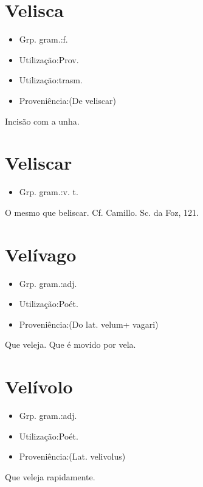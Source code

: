 \documentclass{article}
\begin{document}
\section{Velisca}
\begin{itemize}
\item {Grp. gram.:f.}
\end{itemize}
\begin{itemize}
\item {Utilização:Prov.}
\end{itemize}
\begin{itemize}
\item {Utilização:trasm.}
\end{itemize}
\begin{itemize}
\item {Proveniência:(De \textunderscore veliscar\textunderscore )}
\end{itemize}
Incisão com a unha.
\section{Veliscar}
\begin{itemize}
\item {Grp. gram.:v. t.}
\end{itemize}
O mesmo que \textunderscore beliscar\textunderscore . Cf. Camillo. \textunderscore Sc. da Foz\textunderscore , 121.
\section{Velívago}
\begin{itemize}
\item {Grp. gram.:adj.}
\end{itemize}
\begin{itemize}
\item {Utilização:Poét.}
\end{itemize}
\begin{itemize}
\item {Proveniência:(Do lat. \textunderscore velum\textunderscore  + \textunderscore vagari\textunderscore )}
\end{itemize}
Que veleja.
Que é movido por vela.
\section{Velívolo}
\begin{itemize}
\item {Grp. gram.:adj.}
\end{itemize}
\begin{itemize}
\item {Utilização:Poét.}
\end{itemize}
\begin{itemize}
\item {Proveniência:(Lat. \textunderscore velivolus\textunderscore )}
\end{itemize}
Que veleja rapidamente.
\end{document}
